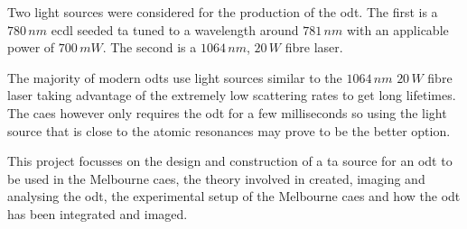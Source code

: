 Two light sources were considered for the production of the \gls{odt}. The first is a $780\,\unit{nm}$ \gls{ecdl} seeded \gls{ta} tuned to a wavelength around $781\,\unit{nm}$ with an applicable power of $700\,\unit{mW}$. The second is a $1064\,\unit{nm}$, $20\,\unit{W}$ fibre laser.

The majority of modern \glspl{odt} use light sources similar to the $1064\,\unit{nm}$ $20\,\unit{W}$ fibre laser taking advantage of the extremely low scattering rates to get long lifetimes. The \gls{caes} however only requires the \gls{odt} for a few milliseconds so using the light source that is close to the atomic resonances may prove to be the better option.

This project focusses on the design and construction of a \gls{ta} source for an \gls{odt} to be used in the Melbourne \gls{caes}, the theory involved in created, imaging and analysing the \gls{odt}, the experimental setup of the Melbourne \gls{caes} and how the \gls{odt} has been integrated and imaged.




